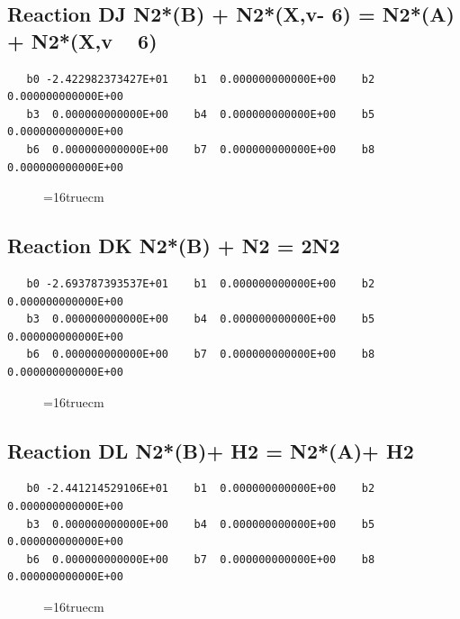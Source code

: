 \documentclass[12pt,dvipdfm]{article}
\begin{document}
\subsection{
Reaction DJ N2*(B) + N2*(X,v- 6)  = N2*(A) + N2*(X,v ~ 6)}
\begin{small}\begin{verbatim}
   b0 -2.422982373427E+01    b1  0.000000000000E+00    b2  0.000000000000E+00
   b3  0.000000000000E+00    b4  0.000000000000E+00    b5  0.000000000000E+00
   b6  0.000000000000E+00    b7  0.000000000000E+00    b8  0.000000000000E+00
   \end{verbatim}\end{small}
\begin{figure}[h!]
\label{n2rates}
\epsfxsize=16truecm
\end{figure}
\newpage

\subsection{
Reaction DK N2*(B) + N2 =  2N2 }
\begin{small}\begin{verbatim}
   b0 -2.693787393537E+01    b1  0.000000000000E+00    b2  0.000000000000E+00
   b3  0.000000000000E+00    b4  0.000000000000E+00    b5  0.000000000000E+00
   b6  0.000000000000E+00    b7  0.000000000000E+00    b8  0.000000000000E+00
   \end{verbatim}\end{small}
\begin{figure}[h!]
\label{n2rates}
\epsfxsize=16truecm
\end{figure}
\newpage

\subsection{
Reaction DL N2*(B)+ H2  = N2*(A)+ H2}
\begin{small}\begin{verbatim}
   b0 -2.441214529106E+01    b1  0.000000000000E+00    b2  0.000000000000E+00
   b3  0.000000000000E+00    b4  0.000000000000E+00    b5  0.000000000000E+00
   b6  0.000000000000E+00    b7  0.000000000000E+00    b8  0.000000000000E+00
   \end{verbatim}\end{small}
\begin{figure}[h!]
\label{n2rates}
\epsfxsize=16truecm
\end{figure}
\newpage
\end{document}
